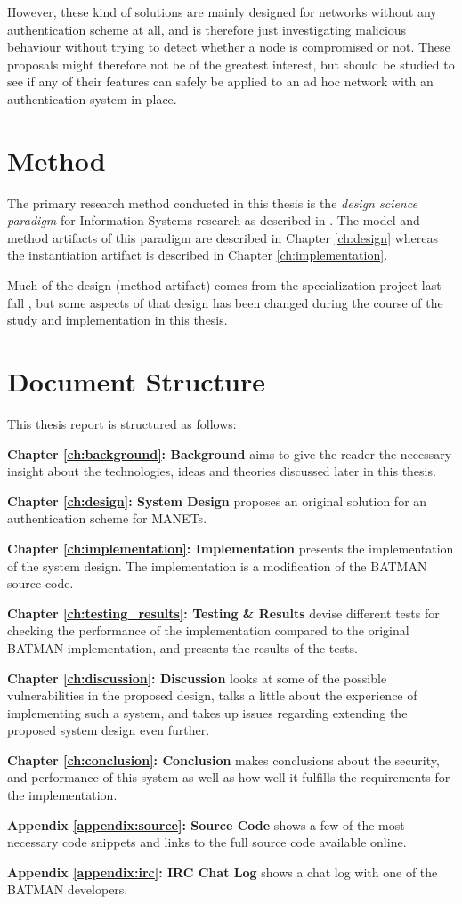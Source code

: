 However, these kind of solutions are mainly designed for networks without any
authentication scheme at all, and is therefore just investigating malicious
behaviour without trying to detect whether a node is compromised or not. These
proposals might therefore not be of the greatest interest, but should be studied
to see if any of their features can safely be applied to an ad hoc network with
an authentication system in place.

\section{Method}
The primary research method conducted in this thesis is the \emph{design
science paradigm} for Information Systems research as described in
\cite{hevner2003information}. The model and method artifacts of this paradigm
are described in Chapter \ref{ch:design} whereas the instantiation artifact is
described in Chapter \ref{ch:implementation}.

Much of the design (method artifact) comes from the specialization project last
fall \cite{bowitz_graarud}, but some aspects of that design has been changed
during the course of the study and implementation in this thesis.

\section{Document Structure}
This thesis report is structured as follows:

\textbf{Chapter \ref{ch:background}: Background} aims to give the reader the
necessary insight about the technologies, ideas and theories discussed later in
this thesis.

\textbf{Chapter \ref{ch:design}: System Design} proposes an original solution
for an authentication scheme for \acp{MANET}.

\textbf{Chapter \ref{ch:implementation}: Implementation} presents the
implementation of the system design. The implementation is a modification of the
\ac{BATMAN} source code.

\textbf{Chapter \ref{ch:testing_results}: Testing \& Results} devise different
tests for checking the performance of the implementation compared to the
original \ac{BATMAN} implementation, and presents the results of the tests.

\textbf{Chapter \ref{ch:discussion}: Discussion} looks at some of the possible
vulnerabilities in the proposed design, talks a little about the experience of
implementing such a system, and takes up issues regarding extending the proposed
system design even further.

\textbf{Chapter \ref{ch:conclusion}: Conclusion} makes conclusions about the
security, and performance of this system as well as how well it fulfills the
requirements for the implementation.

\textbf{Appendix \ref{appendix:source}: Source Code} shows a few of the most
necessary code snippets and links to the full source code available online.

\textbf{Appendix \ref{appendix:irc}: IRC Chat Log} shows a chat log with one of
the BATMAN developers.
